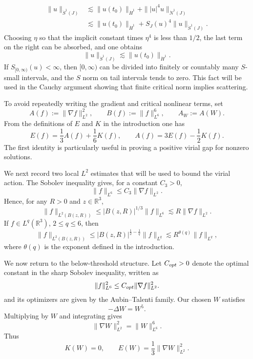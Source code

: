 \documentclass[10pt,a4paper]{amsart}
\numberwithin{equation}{section}
\newcommand{\R}{\mathbb R}
\newcommand{\Nd}{\dot N^1}
\newcommand{\Sd}{\dot S^1}
\begin{document}
\[
\begin{aligned}
  \|u\|_{\Sd(J)}
  &\lesssim \|u(t_0)\|_{\dot H^1}
     +\||u|^4u\|_{\Nd(J)}  \\
  &\lesssim \|u(t_0)\|_{\dot H^1}
     +S_J(u)^4\|u\|_{\Sd(J)}.
\end{aligned}
\]
Choosing $\eta$ so that the implicit constant times $\eta^4$ is less than $1/2$, the last term on the right can be absorbed, and one obtains
\[
  \|u\|_{\Sd(J)}\lesssim \|u(t_0)\|_{\dot H^1}.
\]
If $S_{[0,\infty)}(u)<\infty$, then $[0,\infty)$ can be divided into finitely or countably many $S$-small intervals, and the $S$ norm on tail intervals tends to zero. This fact will be used in the Cauchy argument showing that finite critical norm implies scattering.

To avoid repeatedly writing the gradient and critical nonlinear terms, set
\begin{equation*}
  A(f):=\|\nabla f\|_{L^2}^2,
  \qquad B(f):=\|f\|_{L^6}^6,
  \qquad A_W:=A(W).
\end{equation*}
From the definitions of $E$ and $K$ in the introduction one has
\begin{equation}\label{eq:E-via-A-K}
  E(f)=\frac13A(f)+\frac16K(f),
  \qquad A(f)=3E(f)-\frac12K(f).
\end{equation}
The first identity is particularly useful in proving a positive virial gap for nonzero solutions.

We next record two local $L^2$ estimates that will be used to bound the virial action. The Sobolev inequality gives, for a constant $C_3>0$,
\begin{equation*}
  \|f\|_{L^6}\le C_3\|\nabla f\|_{L^2}.
\end{equation*}
Hence, for any $R>0$ and $z\in\R^3$,
\begin{equation}\label{eq:local-L2-basic}
  \|f\|_{L^2(B(z,R))}
  \le |B(z,R)|^{1/3}\|f\|_{L^6}
  \lesssim R\|\nabla f\|_{L^2}.
\end{equation}
If $f\in L^q(\R^3)$, $2\le q\le6$, then
\begin{equation}\label{eq:local-L2-Lq}
  \|f\|_{L^2(B(z,R))}
  \le |B(z,R)|^{\frac12-\frac1q}\|f\|_{L^q}
  \lesssim R^{\theta(q)}\|f\|_{L^q},
\end{equation}
where $\theta(q)$ is the exponent defined in the introduction.

We now return to the below-threshold structure. Let $C_{\rm opt}>0$ denote the optimal constant in the sharp Sobolev inequality, written as
\begin{equation*}
  \|f\|_{L^6}^2\le C_{\rm opt}\|\nabla f\|_{L^2}^2.
\end{equation*}
and its optimizers are given by the Aubin--Talenti family. Our chosen $W$ satisfies
\begin{equation*}
  -\Delta W=W^5.
\end{equation*}
Multiplying by $W$ and integrating gives
\begin{equation*}
  \|\nabla W\|_{L^2}^2=\|W\|_{L^6}^6.
\end{equation*}
Thus
\begin{equation*}
  K(W)=0,
  \qquad E(W)=\frac13\|\nabla W\|_{L^2}^2.
\end{equation*}
\end{document}
